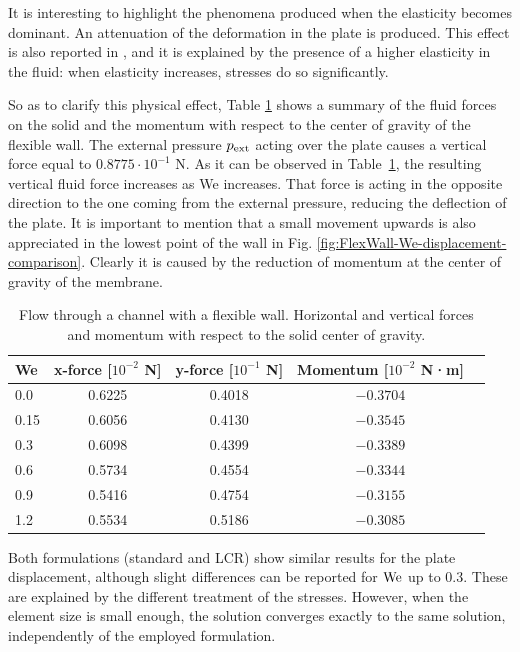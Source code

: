 \documentclass[11pt,english]{article}
\providecommand{\tabularnewline}{\\}
\begin{document}
It is interesting to highlight the phenomena produced when the elasticity becomes dominant. An attenuation of the deformation in the plate is produced. This effect is also reported in \cite{Chen2014numerical}, and it is explained by the presence of a higher elasticity in the fluid: when elasticity increases, stresses do so significantly. 

So as to clarify this physical effect, Table \ref{tab:FSI1 Forces} shows a summary of the fluid forces on the solid and the momentum with respect to the center of gravity of the flexible wall. The external pressure $p_{\rm{ext}}$ acting over the plate causes a vertical force equal to $0.8775\cdot10^{-1}\text{ N}$. As it can be observed in Table~\ref{tab:FSI1 Forces}, the resulting vertical fluid force increases as We increases. That force is acting in the opposite direction to the one coming from the external pressure, reducing the deflection of the plate. It is important to mention that a small movement upwards is also appreciated in the lowest point of the wall in Fig. \ref{fig:FlexWall-We-displacement-comparison}. Clearly it is caused by the reduction of momentum at the center of gravity of the membrane.

\begin{table}[h!]
    \begin{centering}
        \begin{tabular}{lcccc}
            \hline
            \textbf{We}  & \textbf{x-force} [$10^{-2}$ \textbf{N}] & \textbf{y-force} [$10^{-1}$ \textbf{N}] & \textbf{Momentum} [$10^{-2}$ \textbf{N·m}] \tabularnewline
            \hline
            0.0  & 0.6225 & 0.4018 & $-0.3704$ \tabularnewline
            0.15 & 0.6056 & 0.4130 & $-0.3545$\tabularnewline
            0.3  & 0.6098 & 0.4399 & $-0.3389$ \tabularnewline
            0.6  & 0.5734 & 0.4554 & $-0.3344$ \tabularnewline
            0.9  & 0.5416 & 0.4754 & $-0.3155$\tabularnewline
            1.2  & 0.5534 & 0.5186 & $-0.3085$\tabularnewline
            \hline
        \end{tabular}
    \par\end{centering}
    \caption{Flow through a channel with a flexible wall. Horizontal and vertical forces and momentum with respect to the solid center of gravity.}
    \label{tab:FSI1 Forces}
\end{table}

Both formulations (standard and LCR) show similar results for the plate displacement, although slight differences can be reported for $\rm{We}$ up to 0.3. These are explained by the different treatment of the stresses. However, when the element size is small enough, the solution converges exactly to the same solution, independently of the employed formulation.
\end{document}
